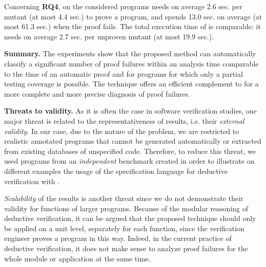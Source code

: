 Concerning \textbf{RQ4},
on the considered programs \Wp needs on average 2.6 sec. per mutant (at most 4.4 sec.) to
prove a program, and spends 13.0 sec. on average (at most 61.3 sec.) when the
proof fails.
The total execution time of \stady is comparable: it needs on average 2.7 sec.  per unproven mutant 
(at most 19.9 sec.).

\textbf{Summary.}
The experiments show that the proposed method can automatically classify a significant number
of proof failures within an analysis time comparable to the time of an automatic proof
and for programs for which only a partial testing coverage is possible.
The \CWD technique offers an efficient complement to \NCD for a more 
complete and more precise diagnosis of proof failures.

\textbf{Threats to validity.}
As it is often the case in software verification studies, one major threat is
related to the 
representativeness of results, i.e. their \textit{external validity}.
In our case, due to the nature of the problem,
we are restricted to realistic annotated programs
that cannot be generated automatically 
or extracted from existing databases of unspecified code.
Therefore, to reduce this threat, we used programs from an \textit{independent}
benchmark \cite{ACSLbyExample} created in order to illustrate
on different examples the usage of the \acsl specification 
language for deductive verification with \framac.



\textit{Scalability} of the results is another threat
since we do not demonstrate their validity for functions of larger programs. 
Because of the modular reasoning of deductive verification,
it can be argued that the proposed technique should only be applied on a unit level,
separately for each function, since the verification engineer proves a program  in this way.
Indeed, in the current practice of deductive verification, it does not make sense to analyze
proof failures for the whole module or application at the same time.

